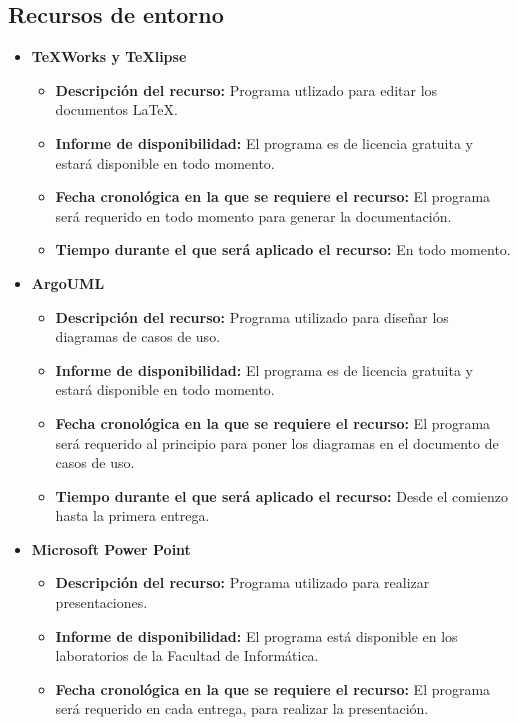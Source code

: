 \documentclass[spanish,a4paper,11pt, twoside]{report}	%
\begin{document}
		\subsection*{Recursos de entorno}
			\begin{itemize}
				  \item \textbf{TeXWorks y TeXlipse}
				  	\begin{itemize}
				  	  \item \textbf{Descripción del recurso: } Programa utlizado para editar los documentos \LaTeX.
				  	  \item \textbf{Informe de disponibilidad: }El programa es de licencia gratuita y estará disponible en 
				  	  			todo momento.
				  	  \item \textbf{Fecha cronológica en la que se requiere el recurso: }El programa será requerido en todo 
				  	  				momento para generar la documentación.
				  	  \item \textbf{Tiempo durante el que será aplicado el recurso: }En todo momento. 
					\end{itemize}
				\item \textbf{ArgoUML}
				  	\begin{itemize}
				  	  \item \textbf{Descripción del recurso: } Programa utilizado para diseñar los diagramas de casos de uso.
				  	  \item \textbf{Informe de disponibilidad: }El programa es de licencia gratuita y estará disponible en 
				  	  			todo momento.
				  	  \item \textbf{Fecha cronológica en la que se requiere el recurso: }El programa será requerido al
				  	  			principio para poner los diagramas en el documento de casos de uso.
				  	  \item \textbf{Tiempo durante el que será aplicado el recurso: }Desde el comienzo hasta la primera entrega. 
					\end{itemize}
				\item \textbf{Microsoft Power Point}
				  	\begin{itemize}
				  	  \item \textbf{Descripción del recurso: } Programa utilizado para realizar presentaciones.
				  	  \item \textbf{Informe de disponibilidad: }El programa está disponible en los laboratorios de la Facultad de Informática.
				  	  \item \textbf{Fecha cronológica en la que se requiere el recurso: }El programa será requerido en cada entrega, para realizar la presentación.

\end{itemize}
\end{itemize}
\end{document}
